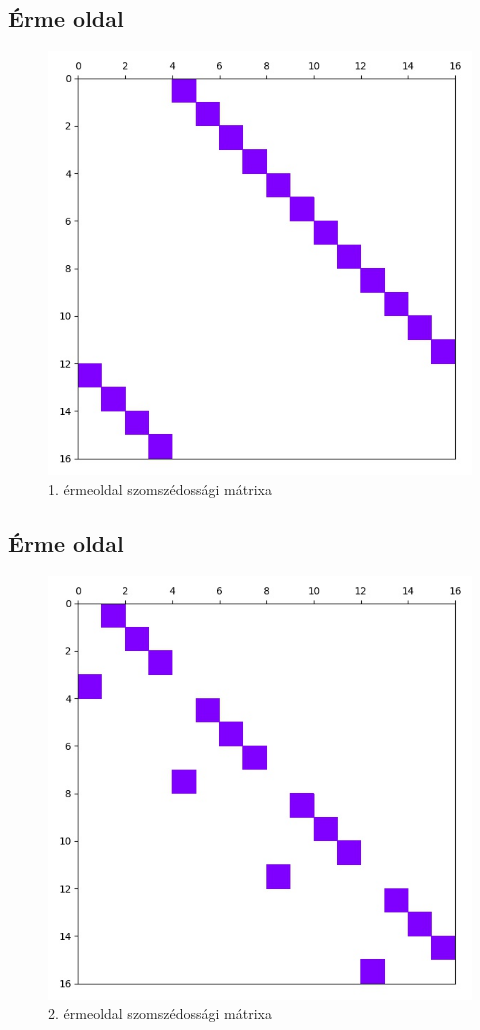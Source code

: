 \documentclass[14pt,a4paper]{article}
\begin{document}
\subsection{Érme oldal}
\begin{figure}[H]
\centering
\includegraphics[width = 0.7\columnwidth]{coin_faces/coin_face_01.jpg}
\caption{1. érmeoldal szomszédossági mátrixa}
\end{figure}
\subsection{Érme oldal}
\begin{figure}[H]
\centering
\includegraphics[width = 0.7\columnwidth]{coin_faces/coin_face_02.jpg}
\caption{2. érmeoldal szomszédossági mátrixa}
\end{figure}
\end{document}
